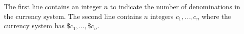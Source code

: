The first line contains an integer $n$ to indicate the number of denominations in
the currency system.
The second line contains $n$ integers $c_1,\ldots,c_n$ where the currency 
system has $\$c_1,\ldots,\$c_n$.
